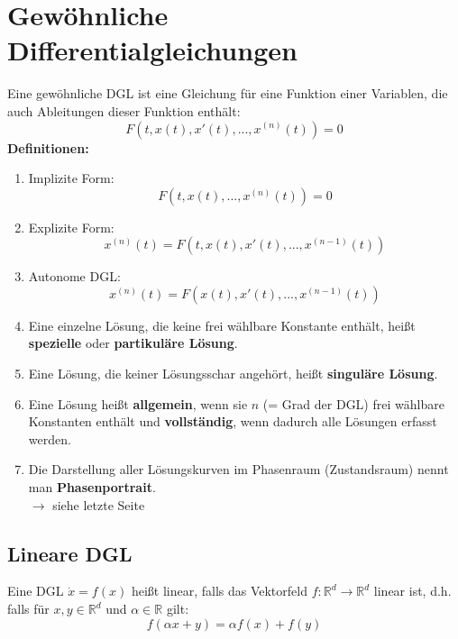 \documentclass[a4paper,twocolumn,10pt]{article}
\begin{document}
\section{Gewöhnliche Differentialgleichungen}
Eine gewöhnliche DGL ist eine Gleichung für eine Funktion einer Variablen, die auch Ableitungen dieser Funktion enthält:
\begin{equation*}
F(t,x(t),x'(t),...,x^{(n)}(t))=0
\end{equation*}
\textbf{Definitionen:}
\begin{enumerate}[label=$\bullet$]
\item Implizite Form:
\begin{equation*}
F(t,x(t),...,x^{(n)}(t))=0
\end{equation*}
\item Explizite Form:
\begin{equation*}
x^{(n)}(t)=F(t,x(t),x'(t),...,x^{(n-1)}(t))
\end{equation*}
\item Autonome DGL:
\begin{equation*}
x^{(n)}(t)=F(x(t),x'(t),...,x^{(n-1)}(t))
\end{equation*}
\item Eine einzelne Lösung, die keine frei wählbare Konstante enthält, heißt \textbf{spezielle} oder \textbf{partikuläre Lösung}.
\item Eine Lösung, die keiner Lösungsschar angehört, heißt \textbf{singuläre Lösung}.
\item Eine Lösung heißt \textbf{allgemein}, wenn sie $n$ (= Grad der DGL) frei wählbare Konstanten enthält und \textbf{vollständig}, wenn dadurch alle Lösungen erfasst werden.
\item Die Darstellung aller Lösungskurven im Phasenraum (Zustandsraum) nennt man \textbf{Phasenportrait}.\\
$\rightarrow$ siehe letzte Seite
\end{enumerate}

\subsection{Lineare DGL}
Eine DGL $\dot{x}=f(x)$ heißt linear, falls das Vektorfeld $f:\mathbb{R}^d\rightarrow\mathbb{R}^d$ linear ist, d.h. falls für $x,y\in\mathbb{R}^d$ und $\alpha\in\mathbb{R}$ gilt:
\begin{equation*}
f(\alpha x+y)=\alpha f(x)+f(y)
\end{equation*}
\end{document}
